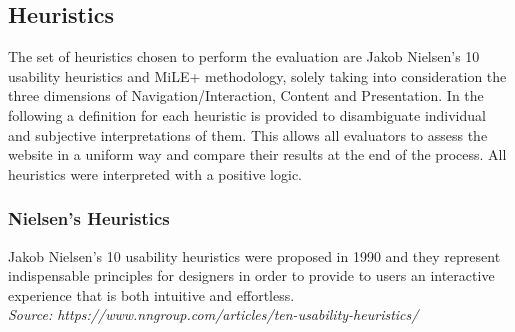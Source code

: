 
\subsection{Heuristics}
The set of heuristics chosen to perform the evaluation are Jakob Nielsen's 10 usability heuristics and MiLE+ methodology, solely taking into consideration the three dimensions of Navigation/Interaction, Content and Presentation. In the following a definition for each heuristic is provided to disambiguate individual and subjective interpretations of them. This allows all evaluators to assess the website in a uniform way and compare their results at the end of the process. All heuristics were interpreted with a positive logic.

\subsubsection{Nielsen’s Heuristics}
Jakob Nielsen’s 10 usability heuristics were proposed in 1990 and they represent indispensable principles for designers in order to provide to users an interactive experience that is both intuitive and effortless.\\
\textit{Source: https://www.nngroup.com/articles/ten-usability-heuristics/}\\

